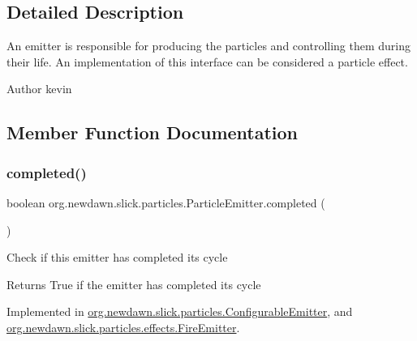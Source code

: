\subsection{Detailed Description}
An emitter is responsible for producing the particles and controlling them during their life. An implementation of this interface can be considered a particle effect.

\begin{DoxyAuthor}{Author}
kevin 
\end{DoxyAuthor}


\subsection{Member Function Documentation}
\mbox{\label{interfaceorg_1_1newdawn_1_1slick_1_1particles_1_1_particle_emitter_a6741f9cbee46594a774b1bfd24a4bf3d}} 
\subsubsection{\texorpdfstring{completed()}{completed()}}
{\footnotesize\ttfamily boolean org.\+newdawn.\+slick.\+particles.\+Particle\+Emitter.\+completed (\begin{DoxyParamCaption}{ }\end{DoxyParamCaption})}

Check if this emitter has completed it\textquotesingle{}s cycle

\begin{DoxyReturn}{Returns}
True if the emitter has completed it\textquotesingle{}s cycle 
\end{DoxyReturn}


Implemented in \mbox{\hyperlink{classorg_1_1newdawn_1_1slick_1_1particles_1_1_configurable_emitter_abcb8dd0c86a998fc1f386254e4a27c86}{org.\+newdawn.\+slick.\+particles.\+Configurable\+Emitter}}, and \mbox{\hyperlink{classorg_1_1newdawn_1_1slick_1_1particles_1_1effects_1_1_fire_emitter_a6048e7cbb34fe2604668027278d47ee3}{org.\+newdawn.\+slick.\+particles.\+effects.\+Fire\+Emitter}}.

\mbox{\label{interfaceorg_1_1newdawn_1_1slick_1_1particles_1_1_particle_emitter_a8a4c81c409b505d6708519c492660746}} 
